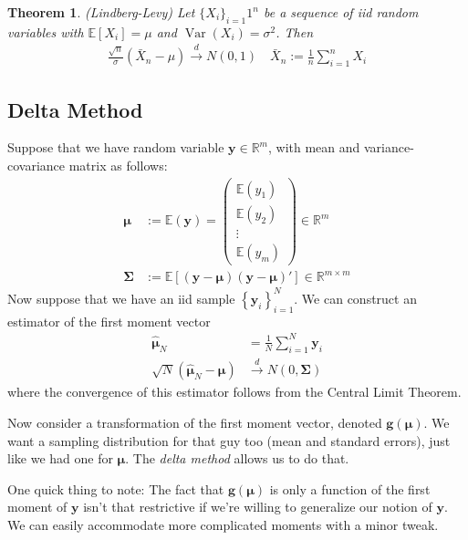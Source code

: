 \documentclass[12pt]{article}
\theoremstyle{plain}
\newtheorem{thm}{Theorem}[section]
\theoremstyle{definition}
\theoremstyle{remark}
\newcommand{\bsg}{\boldsymbol{g}}
\newcommand{\bsy}{\boldsymbol{y}}
\newcommand{\bsmu}{\boldsymbol{\mu}}
\newcommand{\bsSigma}{\boldsymbol{\Sigma}}
\newcommand{\bshatmu}{\boldsymbol{\hat{\mu}}}
\newcommand{\E}{\mathbb{E}}
\newcommand{\Var}{\operatorname{Var}}
\newcommand{\dto}{\xrightarrow{d}}
\newcommand{\sumin}{\sum^n_{i=1}}
\begin{document}
\begin{thm}\emph{(Lindberg-Levy)}
Let $\{X_i\}_{i=1}1^n$ be a sequence of iid random variables with
$\E[X_i] = \mu$ and $\Var(X_i)=\sigma^2$. Then
\begin{align*}
  \frac{\sqrt{n}}{\sigma}
  \left(\bar{X}_n - \mu\right) \dto N(0,1)
  \quad
  \bar{X}_n := \frac{1}{n}\sumin X_i
\end{align*}
\end{thm}


\clearpage
\subsection{Delta Method}

Suppose that we have random variable $\bsy\in \mathbb{R}^m$,
with mean and variance-covariance matrix as follows:
\begin{align*}
  \bsmu &:= \mathbb{E}(\bsy) =
  \begin{pmatrix}
    \mathbb{E}(y_1)\\\mathbb{E}(y_2)\\\vdots\\\mathbb{E}(y_m)
  \end{pmatrix}
  \in \mathbb{R}^m
  \\
  \bsSigma
  &:=
  \mathbb{E}\left[ (\bsy-\bsmu) (\bsy-\bsmu)' \right]
  \in \mathbb{R}^{m\times m}
\end{align*}
Now suppose that we have an iid sample $\left\{\bsy_i\right\}_{i=1}^N$.
We can construct an estimator of the first moment vector
\begin{align*}
  \bshatmu_N
  &=
  \frac{1}{N}
  \sum^N_{i=1}
  \bsy_i\\
  \sqrt{N}(\bshatmu_N - \bsmu)
  &\dto N(0,\bsSigma)
\end{align*}
where the convergence of this estimator follows from the Central Limit
Theorem.

Now consider a transformation of the first moment vector, denoted
$\bsg(\bsmu)$.  We want a sampling distribution for that guy too (mean
and standard errors), just like we had one for $\bsmu$.  The \emph{delta
method} allows us to do that.

One quick thing to note: The fact that $\bsg(\bsmu)$ is only a function
of the first moment of $\bsy$ isn't that restrictive if we're willing to
generalize our notion of $\bsy$. We can easily accommodate more
complicated moments with a minor tweak.
\end{document}
